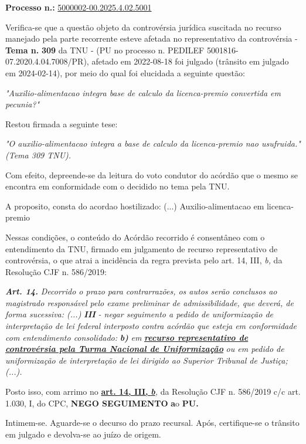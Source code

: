 \documentclass[12pt]{article}
\begin{document}
\justifying
\noindent \textbf{Processo n.: }\uline{5000002-00.2025.4.02.5001}

\noindent Verifica-se que a questão objeto da controvérsia jurídica suscitada no recurso manejado pela parte recorrente esteve afetada no representativo da controvérsia - \textbf{Tema n. }\textbf{309} da TNU - (PU no processo n. PEDILEF 5001816-07.2020.4.04.7008/PR),  afetado em 2022-08-18 foi julgado (trânsito em julgado em 2024-02-14), por meio do qual foi elucidada a seguinte questão:

\noindent \textit{"Auxilio-alimentacao integra base de calculo da licenca-premio convertida em pecunia?"}

\noindent Restou firmada a seguinte tese:

\noindent \textit{"O auxilio-alimentacao integra a base de calculo da licenca-premio nao usufruida." (Tema 309 TNU).}

\noindent Com efeito, depreende-se da leitura do voto condutor do acórdão que o mesmo se encontra em conformidade com o decidido no  tema pela TNU.

\noindent A proposito, consta do acordao hostilizado: (...) Auxilio-alimentacao em licenca-premio

\noindent Nessas condições, o conteúdo do Acórdão recorrido é consentâneo com o entendimento da TNU, firmado em julgamento de recurso representativo de controvérsia, o que atrai a incidência da regra prevista pelo art. 14, III, \textit{b,} da Resolução CJF n. 586/2019:

\noindent \textit{\textbf{Art. 14.}}\textit{ Decorrido o prazo para contrarrazões, os autos serão conclusos ao magistrado responsável pelo exame preliminar de admissibilidade, que deverá, de forma sucessiva: (...) }\textit{\textbf{III }}\textit{- negar seguimento a pedido de uniformização de interpretação de lei federal interposto contra acórdão que esteja em conformidade com entendimento consolidado: }\textit{\textbf{b)}}\textit{ em }\uline{\textit{\textbf{recurso representativo de controvérsia pela Turma Nacional de Uniformização}}}\textit{ ou em pedido de uniformização de interpretação de lei dirigido ao Superior Tribunal de Justiça;(...).}

\noindent Posto isso, com arrimo no \uline{\textbf{art. 14, III, }}\uline{\textit{\textbf{b}}}\textit{,} da Resolução CJF n. 586/2019 c/c art. 1.030, I, do CPC, \textbf{NEGO SEGUIMENTO }\textbf{a}o\textbf{ PU}\textbf{.}

\noindent Intimem-se. Aguarde-se o decurso do prazo recursal. Após, certifique-se o trânsito em julgado e devolva-se ao juízo de origem.
\end{document}
